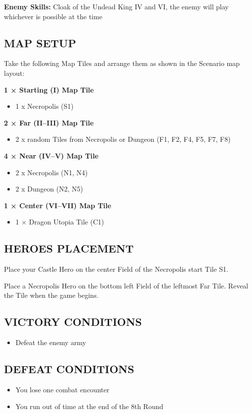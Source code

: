 \begin{multicols*}{2}
\textbf{Enemy Skills:} Cloak of the Undead King IV and VI, the enemy will play whichever is possible at the time

\subsection*{\MakeUppercase{Map setup}}

Take the following Map Tiles and arrange them as shown in the Scenario map layout:

\textbf{1 × Starting (I) Map Tile}
\begin{itemize}
    \item 1 x Necropolis (S1)
\end{itemize}

\textbf{2 × Far (II--III) Map Tile}
\begin{itemize}
    \item 2 x random Tiles from Necropolis or Dungeon (F1, F2, F4, F5, F7, F8)
\end{itemize}

\textbf{4 × Near (IV--V) Map Tile}
\begin{itemize}
    \item 2 x Necropolis (N1, N4)
    \item 2 x Dungeon (N2, N5)
\end{itemize}

\textbf{1 × Center (VI--VII) Map Tile}
\begin{itemize}
  \item 1 × Dragon Utopia Tile (C1)
\end{itemize}

\subsection*{\MakeUppercase{Heroes placement}}

Place your Castle Hero on the center Field of the Necropolis start Tile S1.

Place a Necropolis Hero on the bottom left Field of the leftmost Far Tile. Reveal the Tile when the game begins.

\subsection*{\MakeUppercase{Victory Conditions}}

\begin{itemize}
  \item Defeat the enemy army
\end{itemize}


\subsection*{\MakeUppercase{Defeat Conditions}}
\begin{itemize}
  \item You lose one combat encounter
  \item You run out of time at the end of the 8th Round
\end{itemize}
\end{multicols*}

